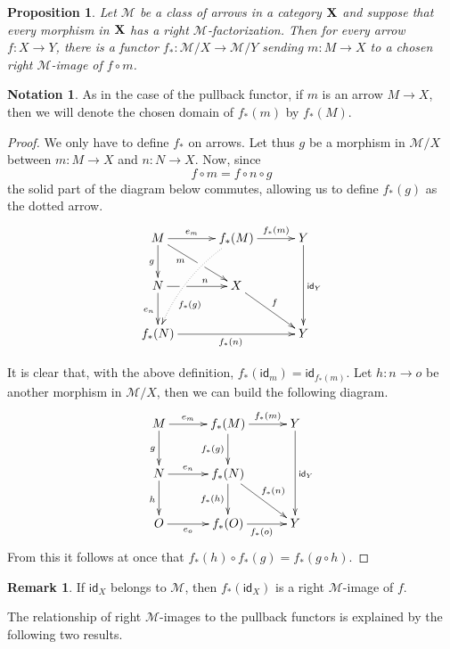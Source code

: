 \documentclass[a4paper]{article}
\newcommand{\id}[1]{\mathsf{id}_{#1}}
\def\X{\textbf {\textup{X}}}
\newtheorem{proposition}[theorem]{Proposition}
\theoremstyle{definition}
\newtheorem*{notation}{Notation}
\newtheorem{remark}[theorem]{Remark}
\begin{document}
\begin{proposition}\label{prop:im}
	Let $\mathcal{M}$ be a class of arrows in a category $\X$ and suppose that every morphism in $\X$ has a right $\mathcal{M}$-factorization. Then for every arrow $f\colon X\to Y$, there is a functor $f_*\colon \mathcal{M}/X\to \mathcal{M}/Y$ sending $m\colon M\to X$ to a chosen right $\mathcal{M}$-image of $f\circ m$.
\end{proposition}
\begin{notation}
	As in the case of the pullback functor, if $m$ is an arrow $M\to X$, then we will denote the chosen domain of $f_*(m)$ by $f_*(M)$.
\end{notation}
\begin{proof}
	We only have to define $f_*$ on arrows. Let thus $g$ be a morphism in $\mathcal{M}/X$ between $m\colon M\to X$ and $n\colon N\to X$. Now, since \[f\circ m = f\circ n\circ g\] the solid part of the diagram below commutes, allowing us to define $f_*(g)$ as the dotted arrow.
	\[\xymatrix@C=30pt{M \ar[dr]_(.35){m}|(.55)\hole\ar[r]^-{e_m} \ar[d]_{g}& f_*(M)  \ar@/_.3cm/@{.>}[ddl]^(.7){f_*(g)}\ar[r]^-{f_*(m)}& Y \ar[dd]^{\id{Y}}\\N \ar[d]_{e_n} \ar[r]|(.32)\hole^(.6){n} & X  \ar[dr]^{f}\\f_*(N) \ar[rr]_{f_*(n)}&& Y}\]
	
	It is clear that, with the above definition, $f_*(\id{m})=\id{f_*(m)}$. Let $h\colon n\to o$ be another morphism in $\mathcal{M}/X$, then we can build the following diagram.
	\[\xymatrix@C=30pt{M \ar[r]^-{e_m} \ar[d]_{g}& f_*(M)  \ar[d]_{f_*(g)}\ar[r]^-{f_*(m)}& Y \ar[dd]^{\id{Y}}\\N \ar[r]^-{e_n} \ar[d]_{h} & f_*(N) \ar[d]_{f_*(h)} \ar[dr]^{f_*(n)}\\O\ar[r]_-{e_o}& f_*(O) \ar[r]_{f_*(o)}& Y}\]
	From this it follows at once that $f_*(h)\circ f_*(g)=f_*(g\circ h)$.
\end{proof}
\begin{remark} If $\id{X}$ belongs to $\mathcal{M}$, then $f_*(\id{X})$ is a right $\mathcal{M}$-image of $f$.
\end{remark}

The relationship of right $\mathcal{M}$-images to the pullback functors is explained by the following two results.
\end{document}
